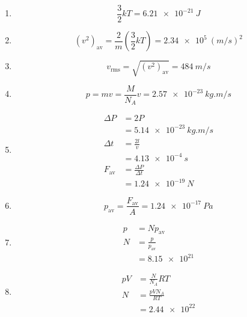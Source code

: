 \documentclass{article}
\begin{document}
\begin{enumerate}
  \item \[\frac{3}{2} k T = \qty{6.21e-21}{J}\]

  \item \[(v^2)_\text{av} = \frac{2}{m} \left( \frac{3}{2} k T \right) = \qty{2.34e5}{(m/s)^2}\]

  \item \[v_\text{rms} = \sqrt{(v^2)_\text{av}} = \qty{484}{m/s}\]

  \item \[p = m v = \frac{M}{N_A} v = \qty{2.57e-23}{kg.m/s}\]

  \item

        \begin{align*}
          \Delta P    & = 2 P                       \\
                      & = \qty{5.14e-23}{kg.m/s}    \\
          \Delta t    & = \frac{2 l}{v}             \\
                      & = \qty{4.13e-4}{s}          \\
          F_\text{av} & = \frac{\Delta P}{\Delta t} \\
                      & = \qty{1.24e-19}{N}
        \end{align*}

  \item \[p_\text{av} = \frac{F_\text{av}}{A} = \qty{1.24e-17}{Pa}\]

  \item

        \begin{align*}
          p & = N p_\text{av}         \\
          N & = \frac{p}{p_\text{av}} \\
            & = \num{8.15e21}
        \end{align*}

  \item

        \begin{align*}
          p V & = \frac{N}{N_A} R T   \\
          N   & = \frac{p V N_A}{R T} \\
              & = \num{2.44e22}
        \end{align*}
\end{enumerate}

\setcounter{subsubsection}{32}
\subsubsection{}
\end{document}
